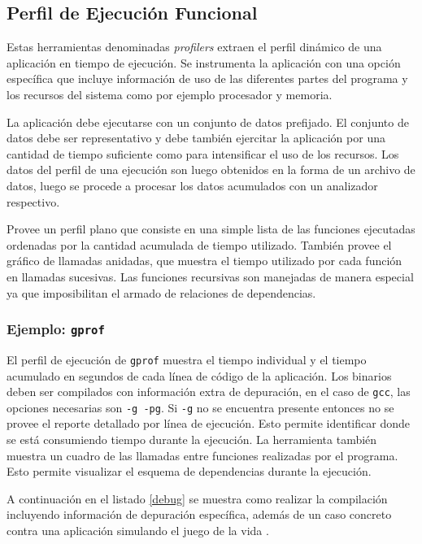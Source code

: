 \documentclass[a4paper]{report}
\begin{document}
\subsection{Perfil de Ejecución Funcional}

Estas herramientas denominadas {\it profilers} extraen el perfil dinámico de una aplicación en tiempo de ejecución. 
Se instrumenta la aplicación con una opción específica que incluye información de uso de las diferentes partes del programa y los recursos del sistema como por ejemplo procesador y memoria.

\bigskip

La aplicación debe ejecutarse con un conjunto de datos prefijado. El conjunto de
datos debe ser representativo y debe también ejercitar la aplicación por
una cantidad de tiempo suficiente como para intensificar el uso de los
recursos. Los datos del perfil de una ejecución son luego obtenidos en la
forma de un archivo de datos, luego se procede a procesar los datos acumulados
con un analizador respectivo.

\bigskip

Provee un perfil plano que consiste en una simple lista de las funciones
ejecutadas ordenadas por la cantidad acumulada de tiempo utilizado.
También provee el gráfico de llamadas anidadas, que muestra el tiempo
utilizado por cada función en llamadas sucesivas. Las funciones recursivas
son manejadas de manera especial ya que imposibilitan el armado de relaciones
de dependencias.

\subsubsection{Ejemplo: {\tt gprof}}

El perfil de ejecución de {\tt gprof} muestra el tiempo individual y el tiempo acumulado en segundos de cada línea de código de la aplicación. Los binarios deben ser compilados con información extra de depuración, en el caso de {\tt gcc}, las opciones necesarias son {\tt -g -pg}. Si {\tt -g} no se encuentra presente entonces no se provee el reporte detallado por línea de ejecución. Esto permite identificar donde se está consumiendo tiempo durante la ejecución.
La herramienta también muestra un cuadro de las llamadas entre funciones realizadas por el programa.
Esto permite visualizar el esquema de dependencias durante la ejecución.

\bigskip

A continuación en el listado \ref{debug} se muestra como realizar la compilación incluyendo información de depuración específica, además de un caso concreto contra una aplicación simulando el juego de la vida \cite{conway}.
\end{document}
